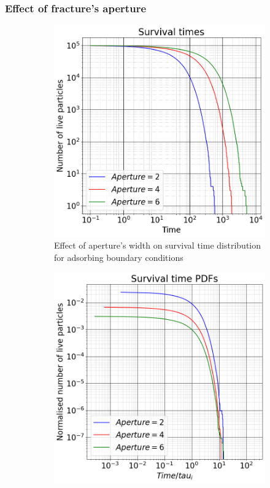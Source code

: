 \documentclass{article}
\begin{document}
\subsubsection{Effect of fracture's aperture}
\begin{figure}[htbp]
    \centering
    \begin{subfigure}[b]{0.45\textwidth}
        \centering
        \includegraphics[width=\textwidth]{images/survTimeDistCompareApe.png}
        \caption{Effect of aperture's width on survival time distribution for adsorbing boundary conditions}
    \end{subfigure}
    \hfill
    \begin{subfigure}[b]{0.45\textwidth}
        \centering
        \includegraphics[width=\textwidth]{images/survTimeDistCompareApeNorm.png}

\end{subfigure}
\end{figure}
\end{document}
